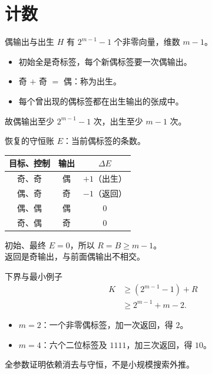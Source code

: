 \documentclass{beamer}
\begin{document}
\section{计数}
\begin{frame}{偶输出与出生}
$H$ 有 $2^{m-1}-1$ 个非零向量，维数 $m-1$。
\begin{itemize}
\item 初始全是奇标签，每个新偶标签要一次偶输出。
\item 奇 $+$ 奇 $=$ 偶：称为出生。
\item 每个曾出现的偶标签都在出生输出的张成中。
\end{itemize}
故偶输出至少 $2^{m-1}-1$ 次，出生至少 $m-1$ 次。
\end{frame}
\begin{frame}{恢复的守恒账}
$E$：当前偶标签的条数。
\begin{center}\begin{tabular}{c|c|c}
目标、控制 & 输出 & $\Delta E$\\\hline
奇、奇 & 偶 & $+1$（出生）\\
偶、奇 & 奇 & $-1$（返回）\\
偶、偶 & 偶 & $0$\\
奇、偶 & 奇 & $0$
\end{tabular}\end{center}
初始、最终 $E=0$，所以 $R=B\geq m-1$。\\[.4em]
返回是奇输出，与前面偶输出不相交。
\end{frame}
\begin{frame}{下界与最小例子}
\[\begin{aligned}
K&\geq(2^{m-1}-1)+R\\
 &\geq2^{m-1}+m-2.
\end{aligned}\]
\begin{itemize}
\item $m=2$：一个非零偶标签，加一次返回，得 $2$。
\item $m=4$：六个二位标签及 $1111$，加三次返回，得 $10$。
\end{itemize}
全参数证明依赖消去与守恒，不是小规模搜索外推。
\end{frame}
\end{document}
